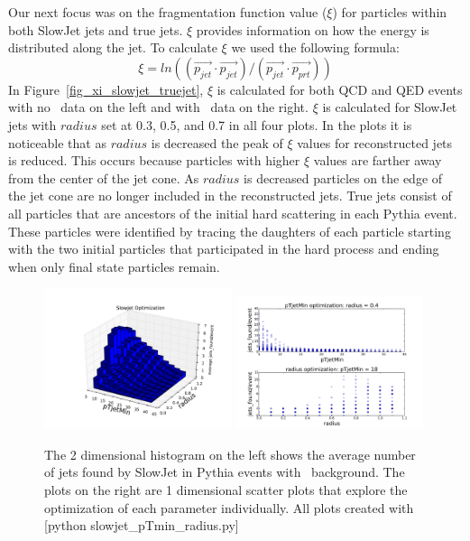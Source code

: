 \documentclass[11pt]{article}
\begin{document}
Our next focus was on the fragmentation function value ($\xi$) for particles within both SlowJet jets and true jets. $\xi$ provides information on how the energy is distributed along the jet. To calculate $\xi$ we used the following formula:
\[\xi = ln((\vec{p_{jet}} \cdot \vec{p_{jet}})/(\vec{p_{jet}} \cdot \vec{p_{prt}}))\]
In Figure~\ref{fig_xi_slowjet_truejet}, $\xi$ is calculated for both QCD and QED events with no \trento\ data on the left and with \trento\ data on the right. $\xi$ is calculated for SlowJet jets with $radius$ set at 0.3, 0.5, and 0.7 in all four plots. In the plots it is noticeable that as $radius$ is decreased the peak of $\xi$ values for reconstructed jets is reduced. This occurs because particles with higher $\xi$ values are farther away from the center of the jet cone. As $radius$ is decreased particles on the edge of the jet cone are no longer included in the reconstructed jets. True jets consist of all particles that are ancestors of the initial hard scattering in each Pythia event. These particles were identified by tracing the daughters of each particle starting with the two initial particles that participated in the hard process and ending when only final state particles remain.

\begin{figure}[h]
\begin{center}
\includegraphics[width=0.49\textwidth]{slowjet_pTmin_radius1.pdf}
\includegraphics[width=0.49\textwidth]{slowjet_pTmin_radius2.pdf}
\caption{The 2 dimensional histogram on the left shows the average number of jets found by SlowJet in Pythia events with \trento\ background. The plots on the right are 1 dimensional scatter plots that explore the optimization of each parameter individually. All plots created with [python slowjet\_pTmin\_radius.py]}
\label{fig_slowjet_pTmin_radius}
\end{center}
\end{figure}
\end{document}
